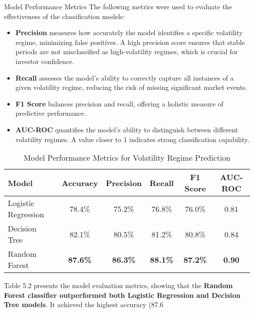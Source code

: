 Model Performance Metrics
The following metrics were used to evaluate the effectiveness of the classification models:

\begin{itemize}
     
    \item \textbf{Precision} measures how accurately the model identifies a specific volatility regime, minimizing false positives. A high precision score ensures that stable periods are not misclassified as high-volatility regimes, which is crucial for investor confidence.
    \item \textbf{Recall} assesses the model’s ability to correctly capture all instances of a given volatility regime, reducing the risk of missing significant market events.
    \item \textbf{F1 Score} balances precision and recall, offering a holistic measure of predictive performance.
    \item \textbf{AUC-ROC} quantifies the model’s ability to distinguish between different volatility regimes. A value closer to 1 indicates strong classification capability.

\end{itemize}

\begin{table}[H]
    \centering
    \caption{Model Performance Metrics for Volatility Regime Prediction}
    \label{tab:model_performance}
    \begin{tabular}{|l|c|c|c|c|c|}
        \hline
        \textbf{Model} & \textbf{Accuracy} & \textbf{Precision} & \textbf{Recall} & \textbf{F1 Score} & \textbf{AUC-ROC} \\
        \hline
        Logistic Regression  & 78.4\%  & 75.2\%  & 76.8\%  & 76.0\%  & 0.81 \\
        \hline
        Decision Tree        & 82.1\%  & 80.5\%  & 81.2\%  & 80.8\%  & 0.84 \\
        \hline
        Random Forest        & \textbf{87.6\%}  & \textbf{86.3\%}  & \textbf{88.1\%}  & \textbf{87.2\%}  & \textbf{0.90} \\
        \hline
    \end{tabular}
\end{table}


Table 5.2 presents the model evaluation metrics, showing that the \textbf{Random Forest classifier outperformed both Logistic Regression and Decision Tree models}. It achieved the highest accuracy (87.6%

